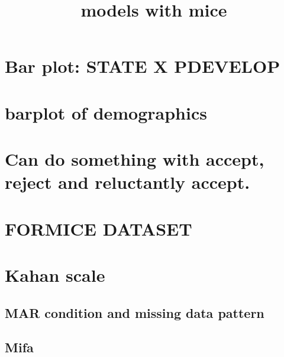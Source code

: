 \documentclass[
]{article}
\title{models with mice}
\author{}
\date{\vspace{-2.5em}}
\begin{document}
\maketitle

{
\setcounter{tocdepth}{2}
\tableofcontents
}
\hypertarget{bar-plot-state-x-pdevelop}{%
\section{Bar plot: STATE X PDEVELOP}\label{bar-plot-state-x-pdevelop}}

\hypertarget{barplot-of-demographics}{%
\section{barplot of demographics}\label{barplot-of-demographics}}

\hypertarget{can-do-something-with-accept-reject-and-reluctantly-accept.}{%
\section{Can do something with accept, reject and reluctantly
accept.}\label{can-do-something-with-accept-reject-and-reluctantly-accept.}}

\hypertarget{formice-dataset}{%
\section{FORMICE DATASET}\label{formice-dataset}}

\hypertarget{kahan-scale}{%
\section{Kahan scale}\label{kahan-scale}}

\hypertarget{mar-condition-and-missing-data-pattern}{%
\subsection{MAR condition and missing data
pattern}\label{mar-condition-and-missing-data-pattern}}

\hypertarget{mifa}{%
\subsection{Mifa}\label{mifa}}
\end{document}
